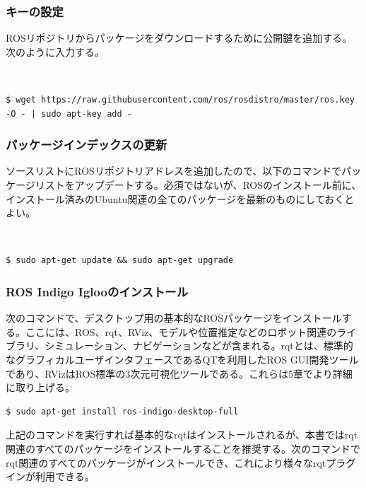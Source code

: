 \subsubsection{キーの設定}

ROSリポジトリからパッケージをダウンロードするために公開鍵を追加する。次のように入力する。

\\
\begin{lstlisting}[language=ROS]
$ wget https://raw.githubusercontent.com/ros/rosdistro/master/ros.key -O - | sudo apt-key add -
\end{lstlisting}

\subsubsection{パッケージインデックスの更新}

ソースリストにROSリポジトリアドレスを追加したので、以下のコマンドでパッケージリストをアップデートする。必須ではないが、ROSのインストール前に、インストール済みのUbuntu関連の全てのパッケージを最新のものにしておくとよい。

\\
\begin{lstlisting}[language=ROS]
$ sudo apt-get update && sudo apt-get upgrade
\end{lstlisting}

\subsubsection{ROS Indigo Iglooのインストール}

次のコマンドで、デスクトップ用の基本的なROSパッケージをインストールする。ここには、ROS、rqt、RViz、モデルや位置推定などのロボット関連のライブラリ、シミュレーション、ナビゲーションなどが含まれる。rqtとは、標準的なグラフィカルユーザインタフェースであるQTを利用したROS GUI開発ツールであり、RVizはROS標準の3次元可視化ツールである。これらは5章でより詳細に取り上げる。

\begin{lstlisting}[language=ROS]
$ sudo apt-get install ros-indigo-desktop-full
\end{lstlisting}

上記のコマンドを実行すれば基本的なrqtはインストールされるが、本書ではrqt関連のすべてのパッケージをインストールすることを推奨する。次のコマンドでrqt関連のすべてのパッケージがインストールでき、これにより様々なrqtプラグインが利用できる。

